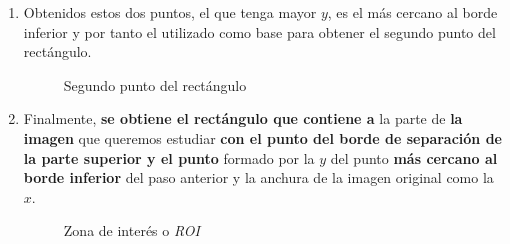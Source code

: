 \begin{enumerate}
\begin{enumerate}[label*=\arabic*.]
\begin{enumerate}[label*=\arabic*.]
    \item Obtenidos estos dos puntos, el que tenga mayor $y$, es el
      más cercano al borde inferior y por tanto el utilizado como base
      para obtener el segundo punto del rectángulo.

      \begin{figure}[H]
        \caption{Segundo punto del rectángulo}
        \centering \setlength\fboxsep{0pt} \setlength\fboxrule{0.5pt}
      \end{figure}

    \item Finalmente, \textbf{se obtiene el rectángulo que contiene a}
      la parte de \textbf{la imagen} que queremos estudiar \textbf{con
        el punto del borde de separación de la parte superior y el
        punto} formado por la $y$ del punto \textbf{más cercano al
        borde inferior} del paso anterior y la anchura de la imagen
      original como la $x$.

      \begin{figure}[H]
        \caption{Zona de interés o \emph{ROI}}
        \centering \setlength\fboxsep{0pt} \setlength\fboxrule{0.5pt}
      \end{figure}


\end{enumerate}
\end{enumerate}
\end{enumerate}
